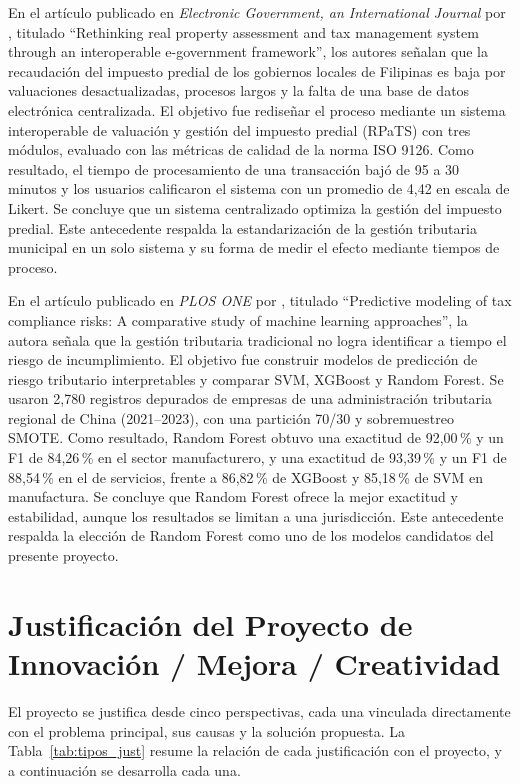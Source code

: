 \documentclass[12pt,a4paper]{report}
\begin{document}
En el artículo publicado en \textit{Electronic Government, an International Journal} por \textcite{omorog2022}, titulado ``Rethinking real property assessment and tax management system through an interoperable e-government framework'', los autores señalan que la recaudación del impuesto predial de los gobiernos locales de Filipinas es baja por valuaciones desactualizadas, procesos largos y la falta de una base de datos electrónica centralizada. El objetivo fue rediseñar el proceso mediante un sistema interoperable de valuación y gestión del impuesto predial (RPaTS) con tres módulos, evaluado con las métricas de calidad de la norma ISO 9126. Como resultado, el tiempo de procesamiento de una transacción bajó de 95 a 30 minutos y los usuarios calificaron el sistema con un promedio de 4,42 en escala de Likert. Se concluye que un sistema centralizado optimiza la gestión del impuesto predial. Este antecedente respalda la estandarización de la gestión tributaria municipal en un solo sistema y su forma de medir el efecto mediante tiempos de proceso.

En el artículo publicado en \textit{PLOS ONE} por \textcite{yang2025}, titulado ``Predictive modeling of tax compliance risks: A comparative study of machine learning approaches'', la autora señala que la gestión tributaria tradicional no logra identificar a tiempo el riesgo de incumplimiento. El objetivo fue construir modelos de predicción de riesgo tributario interpretables y comparar SVM, XGBoost y Random Forest. Se usaron 2,780 registros depurados de empresas de una administración tributaria regional de China (2021--2023), con una partición 70/30 y sobremuestreo SMOTE. Como resultado, Random Forest obtuvo una exactitud de 92,00\,\% y un F1 de 84,26\,\% en el sector manufacturero, y una exactitud de 93,39\,\% y un F1 de 88,54\,\% en el de servicios, frente a 86,82\,\% de XGBoost y 85,18\,\% de SVM en manufactura. Se concluye que Random Forest ofrece la mejor exactitud y estabilidad, aunque los resultados se limitan a una jurisdicción. Este antecedente respalda la elección de Random Forest como uno de los modelos candidatos del presente proyecto.

\section{Justificación del Proyecto de Innovación / Mejora / Creatividad}

El proyecto se justifica desde cinco perspectivas, cada una vinculada directamente con el problema principal, sus causas y la solución propuesta. La Tabla~\ref{tab:tipos_just} resume la relación de cada justificación con el proyecto, y a continuación se desarrolla cada una.
\end{document}
